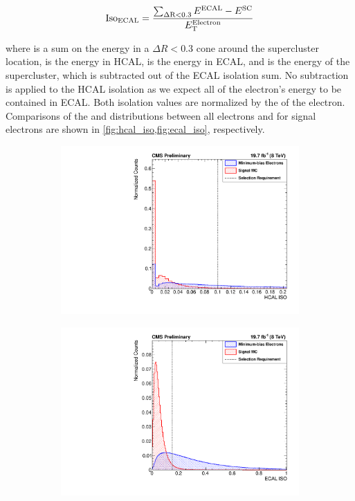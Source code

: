 \begin{equation}
    \text{Iso}_{\text{ECAL}} = \frac{\sum_{\Delta \text{R}<0.3} E^{\text{ECAL}} - E^{\text{SC}}}{E_{\mathrm{T}}^{\text{Electron}}}
\end{equation}

\noindent where \DeltaRSum is a sum on the energy in a $\Delta R < 0.3$ cone around the
supercluster location, \EHCAL is the energy in HCAL, \EECAL is the energy in
ECAL, and \ESC is the energy of the supercluster, which is subtracted out of
the ECAL isolation sum. No subtraction is applied to the HCAL isolation as we
expect all of the electron's energy to be contained in ECAL. Both isolation
values are normalized by the \et of the electron. Comparisons of the \HCALISO
and \ECALISO distributions between all electrons and for signal electrons are
shown in \cref{fig:hcal_iso,fig:ecal_iso}, respectively.

\begin{figure}[!htbp]
    \centering
    \begin{subfigure}[b]{\StackedPlotWidth}
        \includegraphics[width=\textwidth]{figures/e_reco_var_hcal_iso.pdf}
        \caption{}
        \label{fig:hcal_iso}
    \end{subfigure}
    \begin{subfigure}[b]{\StackedPlotWidth}
        \includegraphics[width=\textwidth]{figures/e_reco_var_ecal_iso.pdf}

\end{subfigure}
\end{figure}
